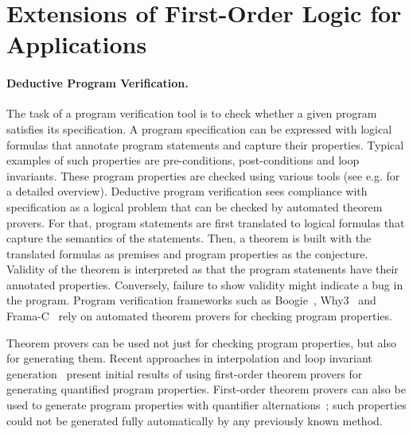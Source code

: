 \section*{Extensions of First-Order Logic for Applications}

\paragraph{Deductive Program Verification.}
The task of a program verification tool is to check whether a given program satisfies its specification. A program specification can be expressed with logical formulas that annotate program statements and capture their properties. Typical examples of such properties are pre-conditions, post-conditions and loop invariants. These program properties are checked using various tools (see e.g. \cite{Bonacina10} for a detailed overview). Deductive program verification sees compliance with specification as a logical problem that can be checked by automated theorem provers. For that, program statements are first translated to logical formulas that capture the semantics of the statements. Then, a theorem is built with the translated formulas as premises and program properties as the conjecture. Validity of the theorem is interpreted as that the program statements have their annotated properties. Conversely, failure to show validity might indicate a bug in the program. Program verification frameworks such as Boogie~\cite{DBLP:conf/fmco/BarnettCDJL05}, Why3~\cite{DBLP:conf/esop/FilliatreP13} and Frama-C~\cite{FramaC} rely on automated theorem provers for checking program properties.

Theorem provers can be used not just for checking program properties, but also for generating them. Recent approaches in interpolation and loop invariant generation~\cite{McMillan08,fase2009,hoder2012popl} present initial results of using first-order theorem provers for generating quantified program properties. First-order theorem provers can also be used to generate program properties with quantifier alternations~\cite{fase2009}; such properties could not be generated fully automatically by any previously known method.


